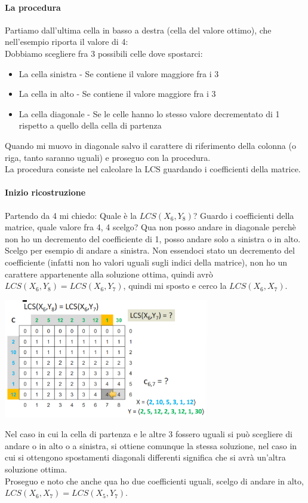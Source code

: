 \paragraph*{La procedura} Partiamo dall'ultima cella in basso a destra (cella del valore ottimo),
che nell'esempio riporta il valore di 4:\\
Dobbiamo scegliere fra 3 possibili celle dove spostarci:
\begin{itemize}
    \item La cella sinistra - Se contiene il valore maggiore fra i 3
    \item La cella in alto - Se contiene il valore maggiore fra i 3
    \item La cella diagonale - Se le celle hanno lo stesso valore decrementato di 1 rispetto a
    quello della cella di partenza
\end{itemize}
Quando mi muovo in diagonale salvo il carattere di riferimento della colonna (o riga, tanto saranno uguali) e proseguo
con la procedura.\\
La procedura consiste nel calcolare la LCS guardando i coefficienti della matrice.\\
\paragraph*{Inizio ricostruzione} Partendo da 4 mi chiedo: Quale è la $LCS(X_6, Y_8)$? Guardo i coefficienti della matrice, quale valore fra 4, 4 scelgo? Qua non posso andare in diagonale perchè 
non ho un decremento del coefficiente di 1, posso andare solo a sinistra o in alto. Scelgo per esempio
di andare a sinistra. Non essendoci stato un decremento del coefficiente (infatti non ho valori uguali sugli indici della
matrice), non ho un carattere appartenente alla soluzione ottima, quindi avrò $LCS(X_6, Y_8) = LCS(X_6, Y_7)$,
quindi mi sposto e cerco la $LCS(X_6, X_7)$.
\begin{center}
    \includegraphics[width=90mm,scale=0.5]{chapters_ulerich/img/LCS_matrix_ricostruzione_sol_ottima.png}
\end{center}
Nel caso in cui la cella di partenza e le altre 3 fossero uguali si può scegliere di andare
o in alto o a sinistra, si ottiene comunque la stessa soluzione, nel caso in cui si ottengono spostamenti
diagonali differenti significa che si avrà un'altra soluzione ottima.\\
Proseguo e noto che anche qua ho due coefficienti uguali, scelgo di andare in alto, 
$LCS(X_6, X_7) = LCS(X_5, Y_7)$.
